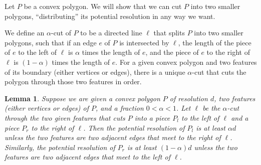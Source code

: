 \documentclass[11pt]{article}
\newtheorem {lemma} {Lemma}
\begin{document}
    Let $P$ be a convex polygon. We will show that we can cut $P$ into two smaller
    polygons, ``distributing'' its potential resolution in any way we want.

    We define an $\alpha$-cut of $P$ to be a directed line $\ell$ that splits $P$
    into two smaller polygons, such that if an edge $e$ of $P$ is intersected by $
    \ell$, the length of the piece of $e$ to the left of $\ell$ is $\alpha$ times
    the length of $e$, and the piece of $e$ to the right of $\ell$ is $(1-\alpha)$
    times the length of $e$.
    For a given convex polygon and two features of its boundary (either vertices
    or edges), there is a unique $\alpha$-cut that cuts the polygon through those
    two features in order.

    \begin {lemma} \label {lem:alphacut}
      Suppose we are
      given a convex polygon $P$ of resolution $d$, two features (either vertices
      or edges) of $P$, and a fraction $0 < \alpha < 1$.
      Let $\ell$ be the $\alpha$-cut through the two given features that cuts $P$
      into a piece $P_l$ to the left of $\ell$ and a piece $P_r$ to the right of $
      \ell$.
      Then the potential resolution of $P_l$ is at least $\alpha d$ unless the two
      features are two adjacent edges that meet to the right of $\ell$.
      Similarly, the potential resolution of $P_r$ is at least $(1-\alpha)d$
      unless the two features are two adjacent edges that meet to the left of $
      \ell$.
    \end {lemma}
\end{document}
